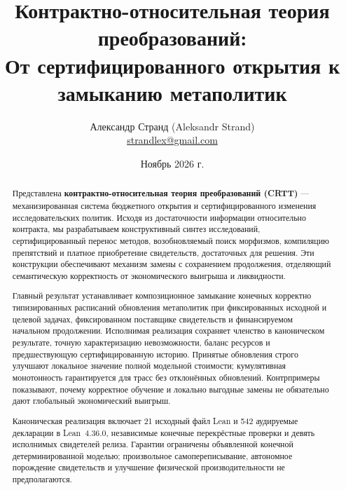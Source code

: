 \documentclass[10pt,a4paper]{article}
\begin{document}
\title{\textbf{Контрактно-относительная теория преобразований:}\\
\large От сертифицированного открытия к замыканию метаполитик}
\author{Александр Странд (Aleksandr Strand)\\[-1pt]{\small\href{mailto:strandlex@gmail.com}{strandlex@gmail.com}}}
\date{\vspace{-11pt}Ноябрь 2026 г.}
\maketitle

\begin{abstract}
Представлена \textbf{контрактно-относительная теория преобразований (CRTT)} --- механизированная система бюджетного открытия и сертифицированного изменения исследовательских политик. Исходя из достаточности информации относительно контракта, мы разрабатываем конструктивный синтез исследований, сертифицированный перенос методов, возобновляемый поиск морфизмов, компиляцию препятствий и платное приобретение свидетельств, достаточных для решения. Эти конструкции обеспечивают механизм замены с сохранением продолжения, отделяющий семантическую корректность от экономического выигрыша и ликвидности.

Главный результат устанавливает композиционное замыкание конечных корректно типизированных расписаний обновления метаполитик при фиксированных исходной и целевой задачах, фиксированном поставщике свидетельств и финансируемом начальном продолжении. Исполнимая реализация сохраняет членство в каноническом результате, точную характеризацию невозможности, баланс ресурсов и предшествующую сертифицированную историю. Принятые обновления строго улучшают локальное значение полной модельной стоимости; кумулятивная монотонность гарантируется для трасс без отклонённых обновлений. Контрпримеры показывают, почему корректное обучение и локально выгодные замены не обязательно дают глобальный экономический выигрыш.

Каноническая реализация включает 21 исходный файл Lean и 542 аудируемые декларации в Lean~4.36.0, независимые конечные перекрёстные проверки и девять исполнимых свидетелей релиза. Гарантии ограничены объявленной конечной детерминированной моделью; произвольное самопереписывание, автономное порождение свидетельств и улучшение физической производительности не предполагаются.
\end{abstract}
\end{document}
